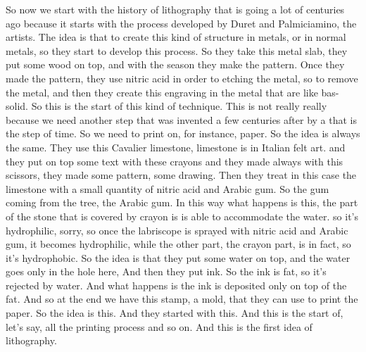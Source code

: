 So now we start with the history of lithography that is going a lot of centuries ago because it starts with the process developed by Duret and Palmiciamino, the artists. The idea is that to create this kind of structure in metals, or in normal metals, so they start to develop this process. So they take this metal slab, they put some wood on top, and with the season they make the pattern. Once they made the pattern, they use nitric acid in order to etching the metal, so to remove the metal, and then they create this engraving in the metal that are like bas-solid. So this is the start of this kind of technique. This is not really really because we need another step that was invented a few centuries after by a that is the step of time. So we need to print on, for instance, paper. So the idea is always the same. They use this Cavalier limestone, limestone is in Italian felt art. and they put on top some text with these crayons and they made always with this scissors, they made some pattern, some drawing. Then they treat in this case the limestone with a small quantity of nitric acid and Arabic gum. So the gum coming from the tree, the Arabic gum. In this way what happens is this, the part of the stone that is covered by crayon is is able to accommodate the water. so it's hydrophilic, sorry, so once the labriscope is sprayed with nitric acid and Arabic gum, it becomes hydrophilic, while the other part, the crayon part, is in fact, so it's hydrophobic. So the idea is that they put some water on top, and the water goes only in the hole here, And then they put ink. So the ink is fat, so it's rejected by water. And what happens is the ink is deposited only on top of the fat. And so at the end we have this stamp, a mold, that they can use to print the paper. So the idea is this. And they started with this. And this is the start of, let's say, all the printing process and so on. And this is the first idea of lithography.
